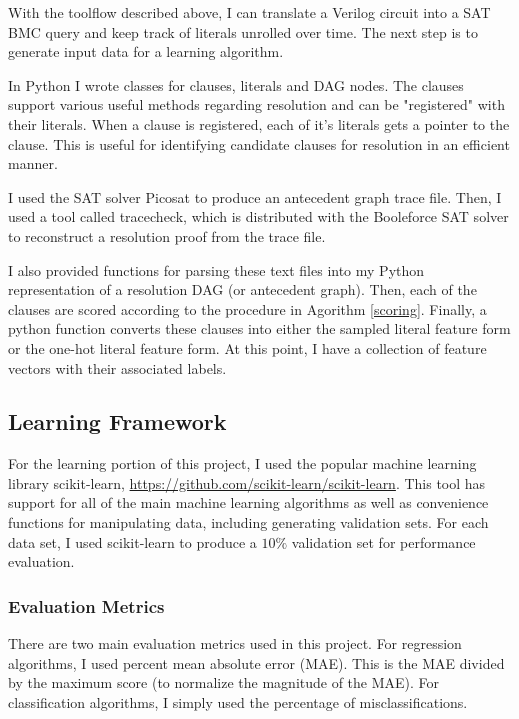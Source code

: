 \documentclass[letterpaper]{article} %
\begin{document}
With the toolflow described above, I can translate a Verilog circuit into a SAT BMC query and keep track of literals unrolled over time. The next step is to generate input data for a learning algorithm.

In Python I wrote classes for clauses, literals and DAG nodes. The clauses support various useful methods regarding resolution and can be "registered" with their literals. When a clause is registered, each of it's literals gets a pointer to the clause. This is useful for identifying candidate clauses for resolution in an efficient manner. 

I used the SAT solver Picosat to produce an antecedent graph trace file. Then, I used a tool called tracecheck, which is distributed with the Booleforce SAT solver to reconstruct a resolution proof from the trace file. 

I also provided functions for parsing these text files into my Python representation of a resolution DAG (or antecedent graph). Then, each of the clauses are scored according to the procedure in Agorithm \ref{scoring}. Finally, a python function converts these clauses into either the sampled literal feature form or the one-hot literal feature form. At this point, I have a collection of feature vectors with their associated labels.

\subsection{Learning Framework}

For the learning portion of this project, I used the popular machine learning library scikit-learn, \url{https://github.com/scikit-learn/scikit-learn}.  This tool has support for all of the main machine learning algorithms as well as convenience functions for manipulating data, including generating validation sets. For each data set, I used scikit-learn to produce a $10\%$ validation set for performance evaluation.

\subsubsection{Evaluation Metrics}

There are two main evaluation metrics used in this project. For regression algorithms, I used percent mean absolute error (MAE). This is the MAE divided by the maximum score (to normalize the magnitude of the MAE). For classification algorithms, I simply used the percentage of misclassifications.
\end{document}
